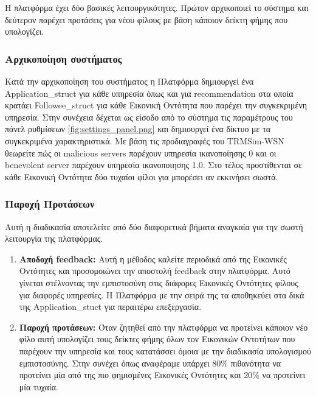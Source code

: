 H πλατφόρμα έχει δύο βασικές λειτουργικότητες. Πρώτον αρχικοποιεί το σύστημα και δεύτερον παρέχει προτάσεις για νέου φίλους με βάση κάποιον δείκτη φήμης που υπολογίζει.

\subsubsection{Αρχικοποίηση συστήματος}

Κατά την αρχικοποίηση του συστήματος η Πλατφόρμα δημιουργεί ένα Application\_struct  για κάθε υπηρεσία όπως και για recommendation στα οποία κρατάει Followee\_struct για κάθε Εικονική Οντότητα που παρέχει την συγκεκριμένη υπηρεσία.
 Στην συνέχεια δέχεται ως είσοδο από το σύστημα τις παραμέτρους του πάνελ ρυθμίσεων \ref{fig:settings_panel.png} και δημιουργεί ένα δίκτυο με τα συγκεκριμένα χαρακτηριστικά. Με βάση τις προδιαγραφές του TRMSim-WSN θεωρείτε πώς οι malicious servers παρέχουν υπηρεσία ικανοποίησης 0 και οι benevolent server παρέχουν υπηρεσία ικανοποιησης 1.0.
  Στο τέλος προστίθενται σε κάθε Εικονική Οντότητα δύο τυχαίοι φίλοι για μπορέσει αν εκκινήσει σωστά.
\newpage

\subsubsection{Παροχή Προτάσεων}

Αυτή η διαδικασία αποτελείτε από δύο διαφορετικά βήματα αναγκαία για την σωστή λειτουργία της πλατφόρμας.

\begin{enumerate}
\item \textbf{Αποδοχή feedback:} Αυτή η μέθοδος καλείτε περιοδικά από της Εικονικές Οντότητες και προσομοιώνει την αποστολή feedback στην πλατφόρμα. Αυτό γίνεται στέλνοντας την εμπιστοσύνη στις διάφορες Εικονικές Οντότητες φίλους για διαφορές υπηρεσίες. Η Πλατφόρμα με την σειρά της τα αποθηκεύει στα δικά της Application\_stuct για περαιτέρω επεξεργασία.

\item\textbf{Παροχή προτάσεων:} Όταν ζητηθεί από την πλατφόρμα να προτείνει κάποιον νέο φίλο αυτή υπολογίζει τους δείκτες φήμης όλων τον Εικονικών Οντοτήτων που παρέχουν την υπηρεσία και τους κατατάσσει όμοια με την διαδικασία υπολογισμού εμπιστοσύνης. Στην συνέχει όπως αναφέραμε υπάρχει 80\% πιθανότητα να προτείνει μία από της πιο φημισμένες Εικονικές Οντότητες και 20\% να προτείνει μία τυχαία.
\end{enumerate}

